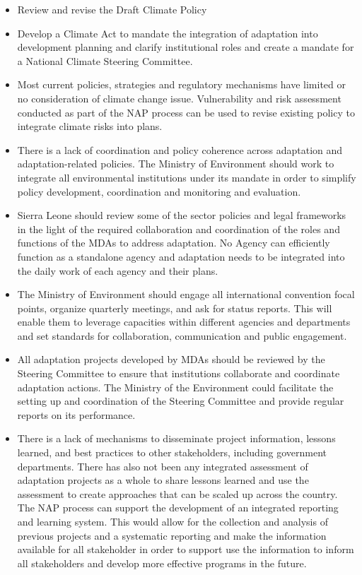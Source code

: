 \documentclass[
]{book}
\begin{document}
\begin{itemize}
\item
  Review and revise the Draft Climate Policy
\item
  Develop a Climate Act to mandate the integration of adaptation into development planning and clarify institutional roles and create a mandate for a National Climate Steering Committee.
\item
  Most current policies, strategies and regulatory mechanisms have limited or no consideration of climate change issue. Vulnerability and risk assessment conducted as part of the NAP process can be used to revise existing policy to integrate climate risks into plans.
\item
  There is a lack of coordination and policy coherence across adaptation and adaptation-related policies. The Ministry of Environment should work to integrate all environmental institutions under its mandate in order to simplify policy development, coordination and monitoring and evaluation.
\item
  Sierra Leone should review some of the sector policies and legal frameworks in the light of the required collaboration and coordination of the roles and functions of the MDAs to address adaptation. No Agency can efficiently function as a standalone agency and adaptation needs to be integrated into the daily work of each agency and their plans.
\item
  The Ministry of Environment should engage all international convention focal points, organize quarterly meetings, and ask for status reports. This will enable them to leverage capacities within different agencies and departments and set standards for collaboration, communication and public engagement.
\item
  All adaptation projects developed by MDAs should be reviewed by the Steering Committee to ensure that institutions collaborate and coordinate adaptation actions. The Ministry of the Environment could facilitate the setting up and coordination of the Steering Committee and provide regular reports on its performance.
\item
  There is a lack of mechanisms to disseminate project information, lessons learned, and best practices to other stakeholders, including government departments. There has also not been any integrated assessment of adaptation projects as a whole to share lessons learned and use the assessment to create approaches that can be scaled up across the country. The NAP process can support the development of an integrated reporting and learning system. This would allow for the collection and analysis of previous projects and a systematic reporting and make the information available for all stakeholder in order to support use the information to inform all stakeholders and develop more effective programs in the future.

\end{itemize}
\end{document}

